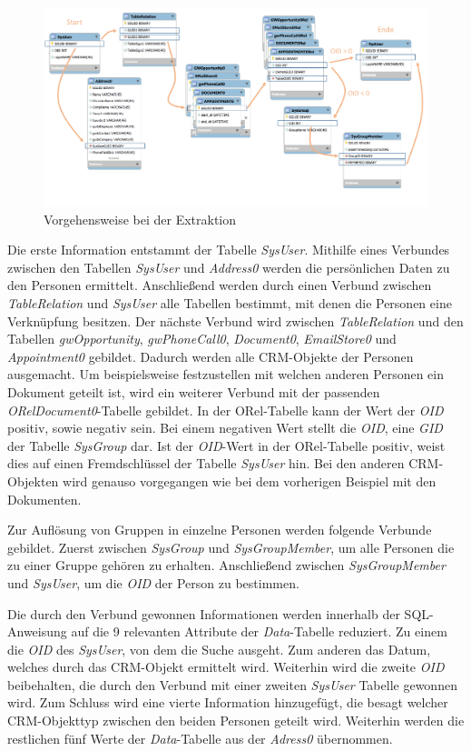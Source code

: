 \begin{figure}[htbp]
\centering
  \includegraphics[width=1.0\textwidth]{pics/konzept_extraktion.pdf}
\caption{Vorgehensweise bei der Extraktion}
\label{umsetzung_extract}
\end{figure} 

Die erste Information entstammt der Tabelle \textit{SysUser}. Mithilfe eines Verbundes zwischen den Tabellen \textit{SysUser} und \textit{Address0} werden die persönlichen Daten zu den Personen ermittelt. Anschließend werden durch einen Verbund zwischen \textit{TableRelation} und \textit{SysUser} alle Tabellen bestimmt, mit denen die Personen eine Verknüpfung besitzen. Der nächste Verbund wird zwischen \textit{TableRelation} und den Tabellen \textit{gwOpportunity}, \textit{gwPhoneCall0}, \textit{Document0}, \textit{EmailStore0} und \textit{Appointment0} gebildet. Dadurch werden alle CRM-Objekte der Personen ausgemacht. Um beispielsweise festzustellen mit welchen anderen Personen ein Dokument geteilt ist, wird ein weiterer Verbund mit der passenden \textit{ORelDocument0}-Tabelle gebildet. In der ORel-Tabelle kann der Wert der \textit{OID} positiv, sowie negativ sein. Bei einem negativen Wert stellt die \textit{OID}, eine \textit{GID} der Tabelle \textit{SysGroup} dar. Ist der \textit{OID}-Wert in der ORel-Tabelle positiv, weist dies auf einen Fremdschlüssel der Tabelle \textit{SysUser} hin. Bei den anderen CRM-Objekten wird genauso vorgegangen wie bei dem vorherigen Beispiel mit den Dokumenten.

Zur Auflösung von Gruppen in einzelne Personen werden folgende Verbunde gebildet. Zuerst zwischen \textit{SysGroup} und \textit{SysGroupMember}, um alle Personen die zu einer Gruppe gehören zu erhalten. Anschließend zwischen \textit{SysGroupMember} und \textit{SysUser}, um die \textit{OID} der Person zu bestimmen.

Die durch den Verbund gewonnen Informationen werden innerhalb der SQL-Anweisung auf die 9 relevanten Attribute der \textit{Data}-Tabelle reduziert. Zu einem die \textit{OID} des \textit{SysUser}, von dem die Suche ausgeht. Zum anderen das Datum, welches durch das CRM-Objekt ermittelt wird. Weiterhin wird die zweite \textit{OID} beibehalten, die durch den Verbund mit einer zweiten \textit{SysUser} Tabelle gewonnen wird. Zum Schluss wird eine vierte Information hinzugefügt, die besagt welcher CRM-Objekttyp  zwischen den beiden Personen geteilt wird. Weiterhin werden die restlichen fünf Werte der \textit{Data}-Tabelle aus der \textit{Adress0} übernommen. 

